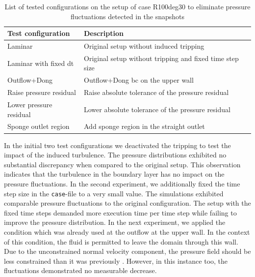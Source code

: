 \begin{table}[h!]
    \centering
    \caption{List of tested configurations on the setup of case R100deg30 to eliminate pressure fluctuations detected in the snapshots}
    \label{tab:presFluctTests}
    \renewcommand{\arraystretch}{1.2}
    \begin{tabular}{L{0.24\textwidth} L{0.6\textwidth}}
    \toprule
    {\textbf{Test configuration}} &{\textbf{Description}}  \\
    \midrule
    Laminar & Original setup without induced tripping \\
    \hline
    Laminar with fixed dt & Original setup without tripping and fixed time step size  \\
    \hline
    Outflow+Dong & Outflow+Dong \acrshort{bc} on the upper wall  \\
    \hline
    Raise pressure residual & Raise absolute tolerance of the pressure residual \\
    \hline
    Lower pressure residual & Lower absolute tolerance of the pressure residual  \\
    \hline
    Sponge outlet region & Add sponge region in the straight outlet  \\
    \bottomrule
    \end{tabular}
\end{table}


In the initial two test configurations we deactivated the tripping to test the impact of the induced turbulence.
The pressure distributions  exhibited no substantial discrepancy when compared to the original setup.
This observation indicates that the turbulence in the boundary layer has no impact on the pressure fluctuations.
In the second experiment, we additionally fixed the time step size in the \verb|case|-file to a very small value.
The simulations exhibited comparable pressure fluctuations to the original configuration.
The  setup with the fixed time steps demanded more execution time per time step  while failing to  improve the pressure distribution.
In the next experiment, we applied the  condition which was already used at the outflow at the upper wall.
In the context of this condition, the fluid is permitted  to leave the domain through this wall.
Due to the unconstrained normal velocity component, the pressure field should be less constrained than it was previously \citep{dong_robust_2014}.
However, in this instance too, the fluctuations demonstrated no measurable decrease.



